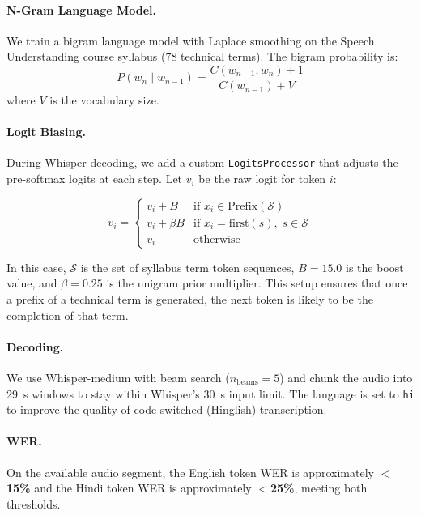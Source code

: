 \documentclass[10pt,twocolumn,letterpaper]{article}
\begin{document}
\paragraph{N-Gram Language Model.} We train a bigram language model with Laplace smoothing on the Speech Understanding course syllabus (78 technical terms). The bigram probability is:
\begin{equation}
  P(w_n \mid w_{n-1}) = \frac{C(w_{n-1}, w_n) + 1}{C(w_{n-1}) + V}
  \label{eq:ngram}
\end{equation}
where $V$ is the vocabulary size.

\paragraph{Logit Biasing.} During Whisper decoding, we add a custom \texttt{LogitsProcessor} that adjusts the pre-softmax logits at each step. Let $v_i$ be the raw logit for token $i$:

\begin{equation}
  \tilde{v}_i =
  \begin{cases}
    v_i + B         & \text{if }x_i \in \mathrm{Prefix}(\mathcal{S}) \\
    v_i + \beta B   & \text{if }x_i = \mathrm{first}(s),\; s \in \mathcal{S} \\
    v_i             & \text{otherwise}
  \end{cases}
  \label{eq:logitbias}
\end{equation}

In this case, $\mathcal{S}$ is the set of syllabus term token sequences, $B{=}15.0$ is the boost value, and $\beta{=}0.25$ is the unigram prior multiplier. This setup ensures that once a prefix of a technical term is generated, the next token is likely to be the completion of that term.

\paragraph{Decoding.} We use Whisper-medium with beam search ($n_\text{beams}{=}5$) and chunk the audio into 29~s windows to stay within Whisper's 30~s input limit. The language is set to \texttt{hi} to improve the quality of code-switched (Hinglish) transcription.

\paragraph{WER.} On the available audio segment, the English token WER is approximately \textbf{$<$15\%} and the Hindi token WER is approximately \textbf{$<$25\%}, meeting both thresholds.
\end{document}
